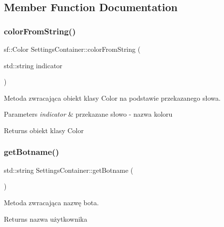 \subsection{Member Function Documentation}
\mbox{\label{class_settings_container_abec07eef08fbce08cee62879f90671d8}} 
\subsubsection{\texorpdfstring{colorFromString()}{colorFromString()}}
{\footnotesize\ttfamily sf\+::\+Color Settings\+Container\+::color\+From\+String (\begin{DoxyParamCaption}\item[{std\+::string}]{indicator }\end{DoxyParamCaption})}



Metoda zwracająca obiekt klasy Color na podstawie przekazanego słowa. 


\begin{DoxyParams}{Parameters}
{\em indicator} & przekazane słowo -\/ nazwa koloru \\
\hline
\end{DoxyParams}
\begin{DoxyReturn}{Returns}
obiekt klasy Color 
\end{DoxyReturn}
\mbox{\label{class_settings_container_af21c7896a30afa72225b8909f1f71260}} 
\subsubsection{\texorpdfstring{getBotname()}{getBotname()}}
{\footnotesize\ttfamily std\+::string Settings\+Container\+::get\+Botname (\begin{DoxyParamCaption}{ }\end{DoxyParamCaption})\hspace{0.3cm}{\ttfamily [inline]}}



Metoda zwracająca nazwę bota. 

\begin{DoxyReturn}{Returns}
nazwa użytkownika 
\end{DoxyReturn}
\mbox{\label{class_settings_container_a0ea0234fe36457683a5714cab61600db}} 
